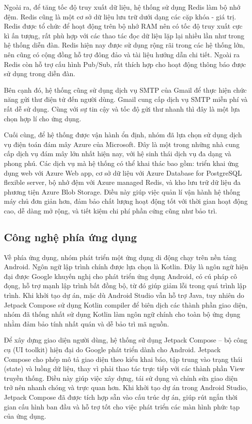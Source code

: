 \documentclass{uetgraduation}
\begin{document}
Ngoài ra, để tăng tốc độ truy xuất dữ liệu, hệ thống sử dụng Redis làm bộ nhớ đệm. Redis cũng là một cơ sở dữ liệu lưu trữ dưới dạng các cặp khóa - giá trị. Redis được tổ chức để hoạt động trên bộ nhớ RAM nên có tốc độ truy xuất cực kì ấn tượng, rất phù hợp với các thao tác đọc dữ liệu lặp lại nhiều lần như trong hệ thống diễn đàn.
Redis hiện nay được sử dụng rộng rãi trong các hệ thống lớn, nên cũng có cộng đồng hỗ trợ đông đảo và tài liệu hướng dẫn chi tiết. Ngoài ra Redis còn hỗ trợ cấu hình Pub/Sub, rất thích hợp cho hoạt động thông báo được sử dụng trong diễn đàn.
\par
Bên cạnh đó, hệ thống cũng sử dụng dịch vụ SMTP của Gmail để thực hiện chức năng gửi thư điện tử đến người dùng. Gmail cung cấp dịch vụ SMTP miễn phí và rất dễ sử dụng. Cùng với sự tin cậy và tốc độ gửi thư nhanh thì đây là một lựa chọn hợp lí cho ứng dụng.
\par
Cuối cùng, để hệ thống được vận hành ổn định, nhóm đã lựa chọn sử dụng dịch vụ điện toán đám mây Azure của Microsoft. Đây là một trong những nhà cung cấp dịch vụ đám mây lớn nhất hiện nay, với hệ sinh thái dịch vụ đa dạng và phong phú. Các dịch vụ mà hệ thống có thể khai thác bao gồm: triển khai ứng dụng web với Azure Web app, cơ sở dữ liệu với Azure Database for PostgreSQL flexible server, bộ nhớ đệm với Azure managed Redis, và kho lưu trữ dữ liệu đa phương tiện Azure Blob Storage.
Điều này giúp việc quản lí vận hành hệ thống máy chủ đơn giản hơn, đảm bảo chất lượng hoạt động tốt với thời gian hoạt động cao, dễ dàng mở rộng, và tiết kiệm chi phí phần cứng cũng như bảo trì.
\subsection {Công nghệ phía ứng dụng}
Về phía ứng dụng, nhóm phát triển 
một ứng dụng di động chạy trên nền tảng Android. 
Ngôn ngữ lập trình chính được lựa chọn là Kotlin. 
Đây là ngôn ngữ hiện đại được Google khuyến nghị 
cho phát triển ứng dụng Android, có cú pháp cô đọng, 
hỗ trợ mạnh lập trình bất đồng bộ, từ đó giúp giảm 
lỗi trong quá trình lập trình. Khi khởi tạo dự án, 
mặc dù Android Studio vẫn hỗ trợ Java, tuy nhiên do 
Jetpack Compose sử dụng Kotlin compiler để biên dịch 
các thành phần giao diện, nhóm đã thống nhất sử dụng 
Kotlin làm ngôn ngữ chính cho toàn bộ ứng dụng nhằm 
đảm bảo tính nhất quán và dễ bảo trì mã nguồn.\par

Để xây dựng giao diện người dùng, hệ thống sử dụng 
Jetpack Compose – bộ công cụ (UI toolkit) hiện đại do 
Google phát triển dành cho Android. Jetpack Compose cho 
phép mô tả giao diện theo kiểu khai báo, tập trung vào 
trạng thái (state) và luồng dữ liệu, thay vì phải thao 
tác trực tiếp với các thành phần View truyền thống. 
Điều này giúp việc xây dựng, tái sử dụng và chỉnh sửa 
giao diện trở nên nhanh chóng và trực quan hơn. Khi khởi 
tạo dự án trong Android Studio, Jetpack Compose đã được 
tích hợp sẵn vào cấu trúc dự án, giúp rút ngắn thời gian 
cấu hình ban đầu và hỗ trợ tốt cho việc phát triển các màn hình phức tạp của ứng dụng.\par
\end{document}
